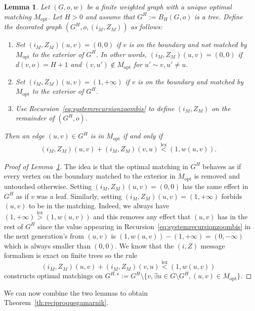 \documentclass[11pt]{article}
\DeclareMathOperator{\lex}{lex}
\newtheorem{lemma}[prop]{Lemma}
\begin{document}
\begin{lemma}\label{lem:matchingbord}
    Let $(G,o,w)$ be a finite weighted graph with a unique optimal matching $M_{\mathrm{opt}}$. Let $H>0$ and assume that $G^H:=B_H(G,o)$ is a tree. 
    Define the decorated graph $(G^H,o, (i_M,Z_M))$ as follows:
    \begin{enumerate}
        \item Set $(i_M,Z_M)(u,v)=(0,0)$ if $v$ is on the boundary and not matched by $M_{\mathrm{opt}}$ to the exterior of $G^H$. In other words, $(i_M,Z_M)(u,v)=(0,0)$ if $d(v,o)=H+1$ and $(v,u') \notin M_{\mathrm{opt}}$ for $u' \sim v, u' \neq u$.
        \item Set $(i_M,Z_M)(u,v)=(1,+\infty)$  if $v$ is on the boundary and matched by $M_{\mathrm{opt}}$ to the exterior of $G^H$.
        \item Use Recursion~\eqref{eq:systemrecursionzoombis} to define $(i_M,Z_M)$ on the remainder of $(G^H,o)$.
    \end{enumerate}
    Then an edge $(u,v)\in G^H$ is in $M_{\mathrm{opt}}$ if and only if
     \begin{align*}
         (i_M,Z_M)(u,v)+(i_M,Z_M)(v,u)\overset{\lex}{<} (1,w(u,v)).
     \end{align*}
\end{lemma}
\begin{proof}[Proof of Lemma~\ref{lem:matchingbord}]
The idea is that the optimal matching in $G^H$ behaves as if every vertex on the boundary matched to the exterior in $M_{\mathrm{opt}}$ is removed and untouched otherwise. Setting $(i_M,Z_M)(u,v)=(0,0)$ has the same effect in $G^H$ as if $v$ was a leaf. Similarly, setting $(i_M,Z_M)(u,v)=(1,+\infty)$ forbids $(u,v)$ to be in the matching. Indeed, we always have  $(1,+\infty)\overset{\lex}{>} (1,w(u,v))$ and this removes any effect that $(u,v)$ has in the rest of $G^H$ since the value appearing in Recursion~\ref{eq:systemrecursionzoombis} in the next generation's from $(u,v)$ is $(1,w(u,v))-(1,+\infty)=(0,-\infty)$ which is always smaller than $(0,0)$. We know that the $(i,Z)$ message formalism is exact on finite trees so the rule \[(i_M,Z_M)(u,v)+(i_M,Z_M)(v,u) \overset{\lex}{<} (1,w(u,v)) \] constructs optimal matchings on $G^{H,\star}:=G^H \setminus \{v, \exists u \in G \setminus G^H, (u,v)\in M_{\mathrm{opt}}\}$. 
\end{proof}
We can now combine the two lemmas to obtain Theorem~\ref{th:reciproquegamarnik}.
\end{document}
